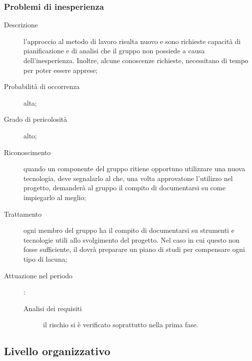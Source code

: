		\subsubsection{Problemi di inesperienza}
		\begin{description}
			\item[Descrizione] l'approccio al metodo di lavoro risulta nuovo e sono richieste capacità di pianificazione e di analisi che il gruppo non possiede a causa dell'inesperienza. Inoltre, alcune conoscenze richieste, necessitano di tempo per poter essere apprese;
			\item[Probabilità di occorrenza] alta;
			\item[Grado di pericolosità] alto;
			\item[Riconoscimento] quando un componente del gruppo ritiene opportuno utilizzare una nuova tecnologia, deve segnalarlo al \Rx{} che, una volta approvatone l'utilizzo nel progetto, demanderà al gruppo il compito di documentarsi su come 	impiegarlo al meglio;
			\item[Trattamento] ogni membro del gruppo ha il compito di documentarsi su strumenti e tecnologie utili allo svolgimento del progetto. Nel caso in cui questo non fosse sufficiente, il \Rx{} dovrà preparare un piano di studi per compensare ogni tipo di lacuna;
			\item[Attuazione nel periodo]:
			\begin{description}
				\item[Analisi dei requisiti]  il rischio si è verificato soprattutto nella prima fase.
			\end{description}
		\end{description}
	\subsection{Livello organizzativo} \label{sec:org}
